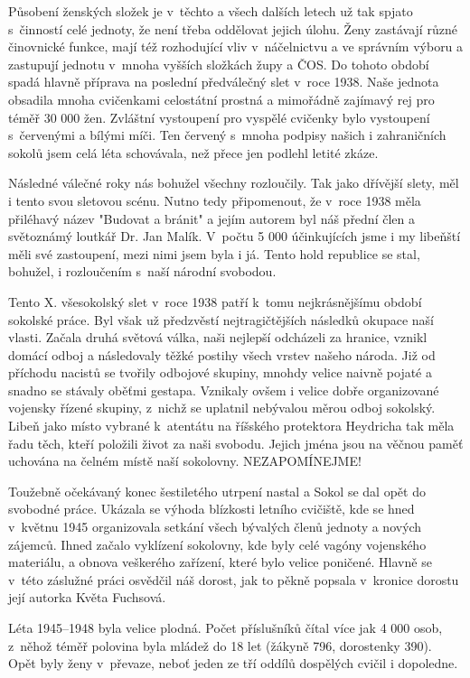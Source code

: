 \documentclass[a5paper, 11pt, twoside]{article}
\begin{document}
Působení ženských složek je v~těchto a všech dalších letech už tak
spjato s~činností celé jednoty, že není třeba oddělovat jejich úlohu.
Ženy zastávají různé činovnické funkce, mají též rozhodující vliv
v~náčelnictvu a ve správním výboru a zastupují jednotu v~mnoha vyšších
složkách župy a ČOS. Do tohoto období spadá hlavně příprava na poslední
předválečný slet v~roce 1938. Naše jednota obsadila mnoha cvičenkami
celostátní prostná a mimořádně zajímavý rej pro téměř 30 000 žen.
Zvláštní vystoupení pro vyspělé cvičenky bylo vystoupení s~červenými a
bílými míči. Ten červený s~mnoha podpisy našich i zahraničních sokolů
jsem celá léta schovávala, než přece jen podlehl letité zkáze.

Následné válečné roky nás bohužel všechny rozloučily. Tak jako dřívější
slety, měl i tento svou sletovou scénu. Nutno tedy připomenout, že
v~roce 1938 měla přiléhavý název "Budovat a bránit" a jejím autorem byl
náš přední člen a světoznámý loutkář Dr. Jan Malík. V~počtu 5 000
účinkujících jsme i my libeňští měli své zastoupení, mezi nimi jsem byla
i já. Tento hold republice se stal, bohužel, i rozloučením s~naší
národní svobodou.

Tento X. všesokolský slet v~roce 1938 patří k~tomu nejkrásnějšímu období
sokolské práce. Byl však už předzvěstí nejtragičtějších následků okupace
naší vlasti. Začala druhá světová válka, naši nejlepší odcházeli za
hranice, vznikl domácí odboj a následovaly těžké postihy všech vrstev
našeho národa. Již od příchodu nacistů se tvořily odbojové skupiny,
mnohdy velice naivně pojaté a snadno se stávaly oběťmi gestapa. Vznikaly
ovšem i velice dobře organizované vojensky řízené skupiny, z~nichž se
uplatnil nebývalou měrou odboj sokolský. Libeň jako místo vybrané
k~atentátu na říšského protektora Heydricha tak měla řadu těch, kteří
položili život za naši svobodu. Jejich jména jsou na věčnou paměť
uchována na čelném místě naší sokolovny. NEZAPOMÍNEJME!

Toužebně očekávaný konec šestiletého utrpení nastal a Sokol se dal opět
do svobodné práce. Ukázala se výhoda blízkosti letního cvičiště, kde se
hned v~květnu 1945 organizovala setkání všech bývalých členů jednoty a
nových zájemců. Ihned začalo vyklízení sokolovny, kde byly celé vagóny
vojenského materiálu, a obnova veškerého zařízení, které bylo velice
poničené. Hlavně se v~této záslužné práci osvědčil náš dorost, jak to
pěkně popsala v~kronice dorostu její autorka Květa Fuchsová.

Léta 1945--1948 byla velice plodná. Počet příslušníků čítal
více jak 4 000 osob, z~něhož téměř polovina byla mládež do 18 let
(žákyně 796, dorostenky 390). Opět byly ženy v~převaze, neboť jeden ze
tří oddílů dospělých cvičil i dopoledne.
\end{document}
